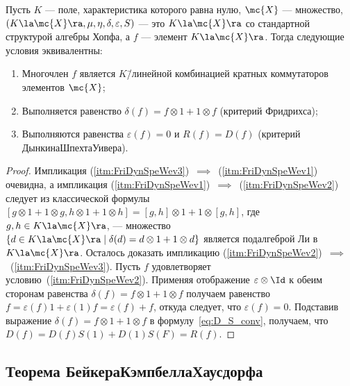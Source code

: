 \documentclass[
	extrafontsizes,
	11pt,
	hyphens,
]{memoir}
\begin{document}
\begin{theorem}
Пусть \(K\) --- поле, характеристика которого равна нулю,
\(\mc{X}\) --- множество,
\((K \la \mc{X} \ra, \mu, \eta, \delta, \varepsilon, S)\)
--- это \(K \la \mc{X} \ra\) со стандартной структурой алгебры Хопфа,
а \(f\) --- элемент \(K \la \mc{X} \ra\).%
\label{thm:FriDynSpeWev}
Тогда следующие условия эквивалентны:
\begin{enumerate}[
	font=\upshape,
	label=\asbuk*),
	ref=\asbuk*,
	]

\item \label{itm:FriDynSpeWev1}
Многочлен \(f\) является \(K\)\=/линейной комбинацией кратных коммутаторов элементов \(\mc{X}\);

\item \label{itm:FriDynSpeWev2}
Выполняется равенство \(\delta(f) = f \otimes 1 + 1 \otimes f\) (критерий Фридрихса);

\item \label{itm:FriDynSpeWev3}
Выполняются равенства \(\varepsilon(f) = 0\) и \(R(f) = D(f)\) (критерий Дынкина\namedash{}Шпехта\namedash{}Уивера).

\end{enumerate}
\end{theorem}

\begin{proof}
Импликация (\ref{itm:FriDynSpeWev3})~\({\implies}\)~(\ref{itm:FriDynSpeWev1}) очевидна, а импликация (\ref{itm:FriDynSpeWev1})~\({\implies}\)~(\ref{itm:FriDynSpeWev2}) следует из классической формулы \([g \otimes 1 + 1 \otimes g, h \otimes 1 + 1 \otimes h] = [g, h] \otimes 1 + 1 \otimes [g, h]\), где \(g, h \in K \la \mc{X} \ra\), --- множество \(\{d \in K \la \mc{X} \ra \mid \delta(d) = d \otimes 1 + 1 \otimes d\}\) является подалгеброй Ли в \(K \la \mc{X} \ra\).
Осталось доказать импликацию (\ref{itm:FriDynSpeWev2})~\({\implies}\)~(\ref{itm:FriDynSpeWev3}).
Пусть \(f\) удовлетворяет условию~(\ref{itm:FriDynSpeWev2}).
Применяя отображение \(\varepsilon \otimes \Id\) к обеим сторонам равенства \(\delta(f) = f \otimes 1 + 1 \otimes f\) получаем равенство \(f = \varepsilon(f) 1 + \varepsilon(1) f = \varepsilon(f) + f\), откуда следует, что \(\varepsilon(f) = 0\).
Подставив выражение \(\delta(f) = f \otimes 1 + 1 \otimes f\) в формулу~\eqref{eq:D_S_conv}, получаем, что \(D(f) = D(f) S(1) + D(1) S(F) = R(f)\).
\end{proof}

\subsection{Теорема Бейкера\namedash{}Кэмпбелла\namedash{}Хаусдорфа}
\end{document}
